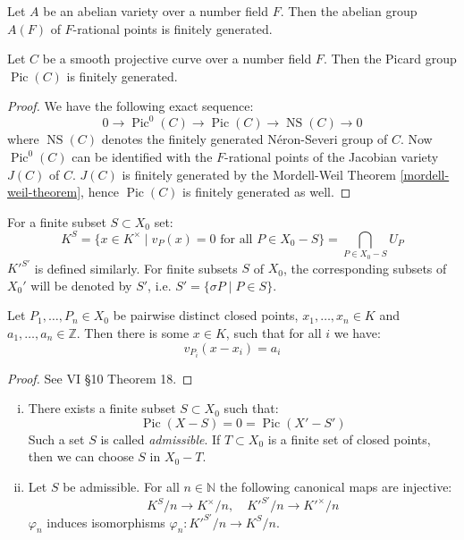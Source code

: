 \begin{theorem}\label{mordell-weil-theorem}
Let $A$ be an abelian variety over a number field $F$. Then the abelian group $A(F)$ of $F$-rational points is finitely generated.
\end{theorem}

\begin{corollary}\label{mordell-weil-corollary}
Let $C$ be a smooth projective curve over a number field $F$. Then the Picard group $\operatorname{Pic}(C)$ is finitely generated.
\end{corollary}

\begin{proof}
We have the following exact sequence:
\[ 0\longrightarrow \operatorname{Pic}^0(C) \longrightarrow\operatorname{Pic}(C) \longrightarrow \operatorname{NS}(C) \longrightarrow 0  \]
where $\operatorname{NS}(C)$ denotes the finitely generated Néron-Severi group of $C$. Now $\operatorname{Pic}^0(C)$ can be identified with the $F$-rational points of the Jacobian variety $J(C)$ of $C$. $J(C)$ is finitely generated by the Mordell-Weil Theorem \ref{mordell-weil-theorem}, hence $\operatorname{Pic}(C)$ is finitely generated as well.
\end{proof}

\begin{definition}\label{4.4}
For a finite subset $S\subset X_0$ set:
\[ K^S=\{x\in K^\times \mid v_P(x)=0\text{ for all }P\in X_0 -  S \} = \bigcap_{P\in X_0 -  S} U_P \]
$K'^{S'}$ is defined similarly. For finite subsets $S$ of $X_0$, the corresponding subsets of $X_0'$ will be denoted by $S'$, i.e. $S'=\{\sigma P\mid P\in S \} $.
\end{definition}

\begin{theorem}\label{weak-approximation}
Let $P_1,\ldots,P_n\in X_0$ be pairwise distinct closed points, $x_1,\ldots,x_n\in K$ and $a_1,\ldots,a_n\in\mathbb{Z}$. Then there is some $x\in K$, such that for all $i$ we have:
\[ v_{P_i}(x-x_i) = a_i \]
\end{theorem}

\begin{proof}
See \cite{ZS60} VI §10 Theorem 18.
\end{proof}

\begin{lemma}\label{4.5}
\begin{enumerate}[(i)]
\item There exists a finite subset $S\subset X_0$ such that:
\[ \operatorname{Pic}(X -  S)=0=\operatorname{Pic}(X' -  S') \]
Such a set $S$ is called \textit{admissible}. If $T\subset X_0$ is a finite set of closed points, then we can choose $S$ in $X_0 -  T$.
\item Let $S$ be admissible. For all $n\in\mathbb{N}$ the following canonical maps are injective:
\[ K^S/n \to K^\times /n,\quad K'^{S'}/n\to K'^\times /n \]
$\varphi_n$ induces isomorphisms $\varphi_n: K'^{S'}/n\to K^S/n$.
\end{enumerate}
\end{lemma}

